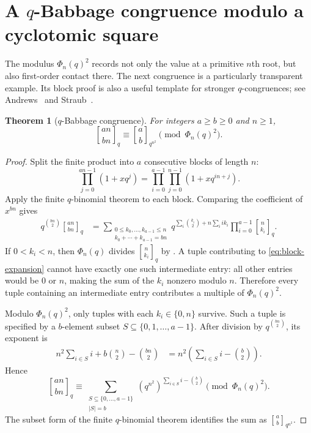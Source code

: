 \documentclass[11pt,oneside,openany]{book}
\newtheorem{theorem}{Theorem}[chapter]
\theoremstyle{definition}
\theoremstyle{remark}
\newcommand{\Qbinom}[3]{\genfrac{[}{]}{0pt}{}{#1}{#2}_{#3}}
\newcommand{\abs}[1]{\lvert #1\rvert}
\begin{document}
\section{A \texorpdfstring{$q$}{q}-Babbage congruence modulo a cyclotomic square}

The modulus $\Phi_n(q)^2$ records not only the value at a primitive $n$th root, but also first-order contact there.  The next congruence is a particularly transparent example.  Its block proof is also a useful template for stronger $q$-congruences; see Andrews~\cite{Andrews1999Congruences} and Straub~\cite{Straub2011Ljunggren}.

\begin{theorem}[$q$-Babbage congruence]\label{thm:q-babbage}
For integers $a\ge b\ge0$ and $n\ge1$,
\[
 \Qbinom{an}{bn}{q}
 \equiv
 \Qbinom ab{q^{n^2}}
 \pmod{\Phi_n(q)^2}.
 \tag{16.9}\label{eq:q-babbage}
\]
\end{theorem}

\begin{proof}
Split the finite product into $a$ consecutive blocks of length $n$:
\[
 \prod_{j=0}^{an-1}(1+xq^j)
 =\prod_{i=0}^{a-1}\prod_{j=0}^{n-1}(1+xq^{in+j}).
\]
Apply the finite $q$-binomial theorem to each block.  Comparing the coefficient of $x^{bn}$ gives
\begin{align}
 q^{\binom{bn}{2}}\Qbinom{an}{bn}{q}
 &=\sum_{\substack{0\le k_0,\ldots,k_{a-1}\le n\\
                    k_0+\cdots+k_{a-1}=bn}}
 q^{\sum_i\binom{k_i}{2}+n\sum_i i k_i}
 \prod_{i=0}^{a-1}\Qbinom n{k_i}q.
 \tag{16.10}\label{eq:block-expansion}
\end{align}
If $0<k_i<n$, then $\Phi_n(q)$ divides $\Qbinom n{k_i}q$ by .  A tuple contributing to \eqref{eq:block-expansion} cannot have exactly one such intermediate entry: all other entries would be $0$ or $n$, making the sum of the $k_i$ nonzero modulo $n$.  Therefore every tuple containing an intermediate entry contributes a multiple of $\Phi_n(q)^2$.

Modulo $\Phi_n(q)^2$, only tuples with each $k_i\in\{0,n\}$ survive.  Such a tuple is specified by a $b$-element subset $S\subseteq\{0,1,\ldots,a-1\}$.  After division by $q^{\binom{bn}{2}}$, its exponent is
\begin{align*}
 n^2\sum_{i\in S}i+b\binom n2-\binom{bn}{2}
 &=n^2\left(\sum_{i\in S}i-\binom b2\right).
\end{align*}
Hence
\[
 \Qbinom{an}{bn}{q}
 \equiv
 \sum_{\substack{S\subseteq\{0,\ldots,a-1\}\\\abs S=b}}
 (q^{n^2})^{\sum_{i\in S}i-\binom b2}
 \pmod{\Phi_n(q)^2}.
\]
The subset form of the finite $q$-binomial theorem identifies the sum as $\Qbinom ab{q^{n^2}}$.
\end{proof}
\end{document}
